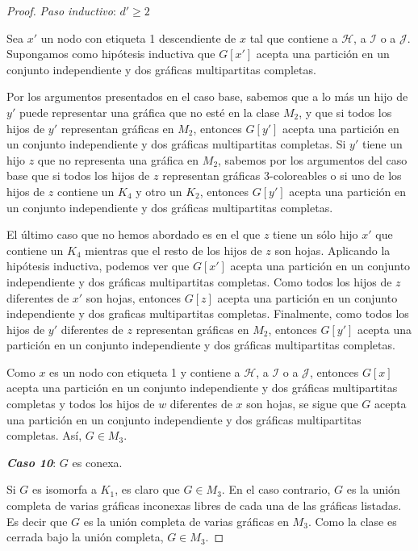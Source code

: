 \begin{proof}
\emph{Paso inductivo}: $d'\geq2$

Sea $x'$ un nodo con etiqueta 1 descendiente de $x$ tal que contiene a $\mathcal{H}$, a $\mathcal{I}$ o a $\mathcal{J}$. Supongamos como hipótesis inductiva que $G[x']$ acepta una partición en un conjunto independiente y dos gráficas multipartitas completas.

Por los argumentos presentados en el caso base, sabemos que a lo más un hijo de $y'$ puede representar una gráfica que no esté en la clase $M_2$, y que si todos los hijos de $y'$ representan gráficas en $M_2$, entonces $G[y']$ acepta una partición en un conjunto independiente y dos gráficas multipartitas completas. Si $y'$ tiene un hijo $z$ que no representa una gráfica en $M_2$, sabemos por los argumentos del caso base que si todos los hijos de $z$ representan gráficas 3-coloreables o si uno de los hijos de $z$ contiene un $K_4$ y otro un $K_2$, entonces $G[y']$ acepta una partición en un conjunto independiente y dos gráficas multipartitas completas. 

El último caso que no hemos abordado es en el que $z$ tiene un sólo hijo $x'$ que contiene un $K_4$ mientras que el resto de los hijos de $z$ son hojas. Aplicando la hipótesis inductiva, podemos ver que $G[x']$ acepta una partición en un conjunto independiente y dos gráficas multipartitas completas. Como todos los hijos de $z$ diferentes de $x'$ son hojas, entonces $G[z]$ acepta una partición en un conjunto independiente y dos graficas multipartitas completas. Finalmente, como todos los hijos de $y'$ diferentes de $z$ representan gráficas en $M_2$, entonces $G[y']$ acepta una partición en un conjunto independiente y dos gráficas multipartitas completas.

Como $x$ es un nodo con etiqueta 1 y contiene a $\mathcal{H}$, a $\mathcal{I}$ o a $\mathcal{J}$, entonces $G[x]$ acepta una partición en un conjunto independiente y dos gráficas multipartitas completas y todos los hijos de $w$ diferentes de $x$ son hojas, se sigue que $G$ acepta una partición en un conjunto independiente y dos gráficas multipartitas completas. Así, $G\in M_3$.


\emph{\textbf{Caso 10}}: $G$ es conexa.

Si $G$ es isomorfa a $K_1$, es claro que $G\in M_3$. En el caso contrario, $G$ es la unión completa de varias gráficas inconexas libres de cada una de las gráficas listadas. Es decir que $G$ es la unión completa de varias gráficas en $M_3$. Como la clase es cerrada bajo la unión completa, $G\in M_3$.
   
\end{proof}